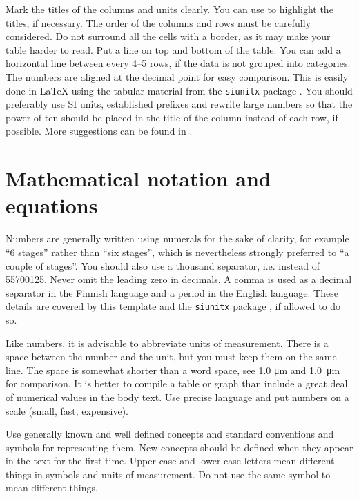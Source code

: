Mark the titles of the columns and units clearly. You can use  to highlight the titles, if necessary. The order of the columns and rows must be carefully considered. Do not surround all the cells with a border, as it may make your table harder to read. Put a line on top and bottom of the table. You can add a horizontal line between every 4–5 rows, if the data is not grouped into categories. The numbers are aligned at the decimal point for easy comparison. This is easily done in \LaTeX{} using the tabular material from the \texttt{siunitx} package \parencite{siunitx}. You should preferably use SI units, established prefixes and rewrite large numbers so that the power of ten should be placed in the title of the column instead of each row, if possible. More suggestions can be found in \parencite{pubadvice2009}.


\section{Mathematical notation and equations}

Numbers are generally written using numerals for the sake of clarity, for example ``6 stages'' rather than ``six stages'', which is nevertheless strongly preferred to ``a couple of stages''. You should also use a thousand separator, i.e. instead of 55700125. Never omit the leading zero in decimals. A comma is used as a decimal separator in the Finnish language and a period in the English language. These details are covered by this template and the \texttt{siunitx} package \parencite{siunitx}, if allowed to do so.

Like numbers, it is advisable to abbreviate units of measurement. There is a space between the number and the unit, but you must keep them on the same line. The space is somewhat shorter than a word space, see 1.0 \si{\micro\metre} and \SI{1.0}{\micro\metre} for comparison. It is better to compile a table or graph than include a great deal of numerical values in the body text. Use precise language and put numbers on a scale (small, fast, expensive).

Use generally known and well defined concepts and standard conventions and symbols for representing them. New concepts should be defined when they appear in the text for the first time. Upper case and lower case letters mean different things in symbols and units of measurement. Do not use the same symbol to mean different things.

